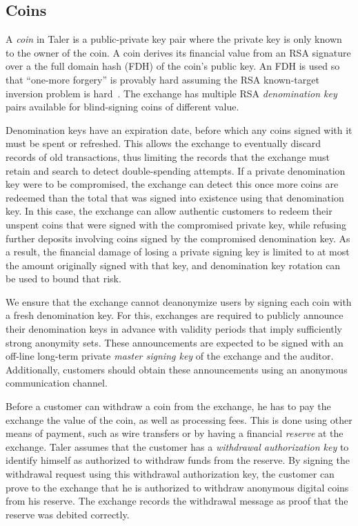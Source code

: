 \documentclass{llncs}
\begin{document}
\subsection{Coins}

A \emph{coin} in Taler is a public-private key pair where the private
key is only known to the owner of the coin.  A coin derives its
financial value from an RSA signature over a the full domain hash
(FDH) of the coin's public key.  An FDH is used so that ``one-more
forgery'' is provably hard assuming the RSA known-target inversion
problem is hard~\cite[Theorem 12]{RSA-HDF-KTIvCTI}.  The exchange has
multiple RSA {\em denomination key} pairs available for blind-signing
coins of different value.

Denomination keys have an expiration date, before which any coins
signed with it must be spent or refreshed.  This allows the exchange
to eventually discard records of old transactions, thus limiting the
records that the exchange must retain and search to detect
double-spending attempts.  If a private denomination key were to be
compromised, the exchange can detect this once more coins are redeemed
than the total that was signed into existence using that denomination
key.  In this case, the exchange can allow authentic customers to
redeem their unspent coins that were signed with the compromised
private key, while refusing further deposits involving coins signed by
the compromised denomination key.  As a result, the financial damage
of losing a private signing key is limited to at most the amount
originally signed with that key, and denomination key rotation can be
used to bound that risk.

We ensure that the exchange cannot deanonymize users by signing
each coin with a fresh denomination key.  For this, exchanges are
required to publicly announce their denomination keys in advance
with validity periods that imply sufficiently strong anonymity sets.
These announcements are expected to be signed with an off-line
long-term private {\em master signing key} of the exchange and the
auditor.  Additionally, customers should obtain these announcements
using an anonymous communication channel.

Before a customer can withdraw a coin from the exchange, he has to pay
the exchange the value of the coin, as well as processing fees.  This
is done using other means of payment, such as wire transfers or by
having a financial {\em reserve} at the exchange.  Taler assumes that
the customer has a {\em withdrawal authorization key} to identify
himself as authorized to withdraw funds from the reserve.  By signing
the withdrawal request using this withdrawal authorization key, the
customer can prove to the exchange that he is authorized to withdraw
anonymous digital coins from his reserve.  The exchange records the
withdrawal message as proof that the reserve was debited correctly.
\end{document}
